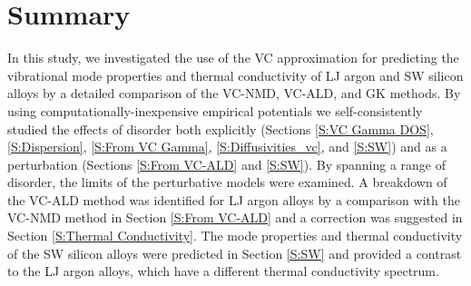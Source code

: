 


\section{\label{S:Summary}Summary}

In this study, we investigated the use of the VC 
approximation for predicting the vibrational mode properties and 
thermal conductivity of LJ argon and SW silicon alloys 
by a detailed comparison of the VC-NMD, VC-ALD, and GK methods. 
By using computationally-inexpensive  
empirical potentials we self-consistently studied the effects of 
disorder both explicitly (Sections \ref{S:VC Gamma DOS}, 
\ref{S:Dispersion},  
\ref{S:From VC Gamma}, \ref{S:Diffusivities_vc}, and \ref{S:SW}) 
and as a perturbation (Sections \ref{S:From VC-ALD} and \ref{S:SW}). 
By spanning a range of disorder, the limits of the 
perturbative models were examined.
A breakdown of the VC-ALD method was identified for LJ argon alloys 
by a comparison with the VC-NMD method in 
Section \ref{S:From VC-ALD}   
and a correction was suggested in Section \ref{S:Thermal Conductivity}. 
The mode properties and thermal 
conductivity of the SW silicon alloys were predicted in 
Section \ref{S:SW} and provided a contrast to the 
LJ argon alloys, which have a different thermal conductivity 
spectrum. 

